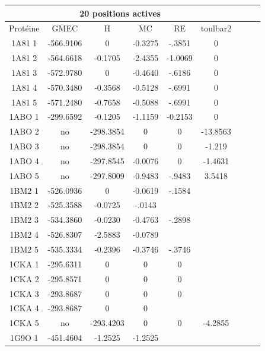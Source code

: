 \documentclass[a4paper,12pt]{article}
\begin{document}
    \begin{table}[h]
      \centering

      \begin{tabular}{|c|c|c|c|c|c|c|c|c|}


        \hline
        \multicolumn{6}{|c|}{20 positions actives} \\
        \hline
        Protéine & GMEC & H & MC & RE & toulbar2\\
        \hline
        1A81 1 & -566.9106 & 0 & -0.3275 & -.3851 & 0 \\         
        1A81 2 & -564.6618 & -0.1705 & -2.4355 & -1.0069 & 0\\   
        1A81 3 & -572.9780 & 0 & -0.4640 & -.6186 & 0 \\         
        1A81 4 & -570.3480 & -0.3568 & -0.5128 & -.6991 & 0\\    
        1A81 5 & -571.2480 & -0.7658 & -0.5088 & -.6991 & 0\\    
        1ABO 1 & -299.6592 & -0.1205 & -1.1159 & -0.2153 & 0\\   
        1ABO 2 & no & -298.3854 & 0 & 0 & -13.8563 \\             
        1ABO 3 & no & -298.3854 & 0 & 0 & -1.219\\                 
        1ABO 4 & no & -297.8545 & -0.0076 & 0 & -1.4631\\          
        1ABO 5 & no & -297.8009 & -0.9483 & -.9483 & 3.5418\\      
        1BM2 1 & -526.0936 & 0 & -0.0619 & -.1584 \\             
        1BM2 2 & -525.3588 & -0.0725 & -.0143 \\                 
        1BM2 3 & -534.3860 & -0.0230 & -0.4763 & -.2898 \\       
        1BM2 4 & -526.8307 & -2.5883 & -0.0789 \\                
        1BM2 5 & -535.3334 & -0.2396 & -0.3746 & -.3746 \\       
        1CKA 1 & -295.6311 & 0 & 0 & 0\\                         
        1CKA 2 & -295.8571 & 0 & 0 & 0 \\                        
        1CKA 3 & -293.8687 & 0 & 0 & 0 \\                        
        1CKA 4 & -293.8687 & 0 & 0 \\                            
        1CKA 5 & no & -293.4203 & 0 & 0 & -4.2855\\   
        1G9O 1 & -451.4604 & -1.2525 & -1.2525 \\     

\end{tabular}
\end{table}
\end{document}
